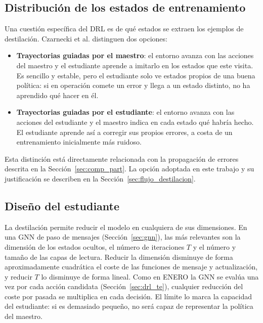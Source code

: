 \subsection{Distribución de los estados de entrenamiento}\label{sec:kd_estados}

Una cuestión específica del DRL es de qué estados se extraen los ejemplos de destilación. Czarnecki et al. \cite{czarnecki2019distilling} distinguen dos opciones:
\begin{itemize}
	\item \textbf{Trayectorias guiadas por el maestro}: el entorno avanza con las acciones del maestro y el estudiante aprende a imitarlo en los estados que este visita. Es sencillo y estable, pero el estudiante solo ve estados propios de una buena política: si en operación comete un error y llega a un estado distinto, no ha aprendido qué hacer en él.
	\item \textbf{Trayectorias guiadas por el estudiante}: el entorno avanza con las acciones del estudiante y el maestro indica en cada estado qué habría hecho. El estudiante aprende así a corregir sus propios errores, a costa de un entrenamiento inicialmente más ruidoso.
\end{itemize}
Esta distinción está directamente relacionada con la propagación de errores descrita en la Sección~\ref{sec:comp_part}. La opción adoptada en este trabajo y su justificación se describen en la Sección~\ref{sec:flujo_destilacion}.

\subsection{Diseño del estudiante}\label{sec:kd_estudiante}

La destilación permite reducir el modelo en cualquiera de sus dimensiones. En una GNN de paso de mensajes (Sección~\ref{sec:gnn}), las más relevantes son la dimensión de los estados ocultos, el número de iteraciones $T$ y el número y tamaño de las capas de lectura. Reducir la dimensión disminuye de forma aproximadamente cuadrática el coste de las funciones de mensaje y actualización, y reducir $T$ lo disminuye de forma lineal. Como en ENERO la GNN se evalúa una vez por cada acción candidata (Sección~\ref{sec:drl_te}), cualquier reducción del coste por pasada se multiplica en cada decisión. El límite lo marca la capacidad del estudiante: si es demasiado pequeño, no será capaz de representar la política del maestro.

